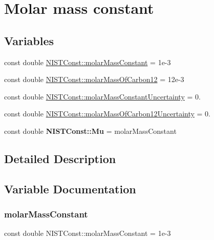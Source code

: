 \hypertarget{group___molar_mass_constant}{}\section{Molar mass constant}
\label{group___molar_mass_constant}
\subsection*{Variables}
\begin{DoxyCompactItemize}
\item 
const double \hyperlink{group___molar_mass_constant_ga83c1719df0cda1b4eae15de014b8f857}{N\+I\+S\+T\+Const\+::molar\+Mass\+Constant} = 1e-\/3
\item 
const double \hyperlink{group___molar_mass_constant_gab1aae3b38f21cb9a15fdc8209d3cf1f0}{N\+I\+S\+T\+Const\+::molar\+Mass\+Of\+Carbon12} = 12e-\/3
\item 
const double \hyperlink{group___molar_mass_constant_ga7aea373fd7ef8740aa22140aab339ce8}{N\+I\+S\+T\+Const\+::molar\+Mass\+Constant\+Uncertainty} = 0.
\item 
const double \hyperlink{group___molar_mass_constant_gae2fea17985c3e8877e1baab9f9382676}{N\+I\+S\+T\+Const\+::molar\+Mass\+Of\+Carbon12\+Uncertainty} = 0.
\item 
\mbox{\label{group___molar_mass_constant_ga06104635bf45affb9e10a3f6581b4076}} 
const double {\bfseries N\+I\+S\+T\+Const\+::\+Mu} = molar\+Mass\+Constant
\end{DoxyCompactItemize}


\subsection{Detailed Description}


\subsection{Variable Documentation}
\mbox{\label{group___molar_mass_constant_ga83c1719df0cda1b4eae15de014b8f857}} 
\subsubsection{\texorpdfstring{molar\+Mass\+Constant}{molarMassConstant}}
{\footnotesize\ttfamily const double N\+I\+S\+T\+Const\+::molar\+Mass\+Constant = 1e-\/3}

